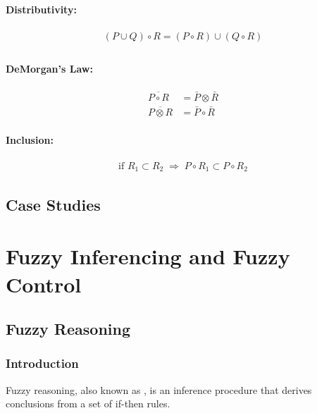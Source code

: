 \documentclass{tron}
\begin{document}
\paragraph{Distributivity:}
\begin{align}
	(P \cup Q) \circ R = (P \circ R) \cup (Q \circ R) \\
\end{align}
\paragraph{DeMorgan's Law:}
\begin{align}
	\overline{P \circ R} &= \bar{P} \otimes \bar{R}\\
	\overline{P \otimes R} &= \bar{P} \circ \bar{R}
\end{align}
\paragraph{Inclusion:}
\begin{align}
	\text{if } R_1 \subset R_2 \; \Rightarrow \; P\circ R_1 \subset P \circ R_2 
\end{align}

\clearpage
\subsection{Case Studies}

\newpage
\section{Fuzzy Inferencing and Fuzzy Control}
\subsection{Fuzzy Reasoning}
\subsubsection{Introduction}
\begin{remark}{}
	Fuzzy reasoning, also known as , is an inference procedure that derives conclusions from a set of if-then rules.
\end{remark}
\end{document}
